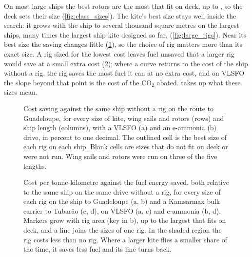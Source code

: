 On most large ships the best rotors are the most that fit on deck, up to \NumMostUnitsRotors{}, so the deck sets their size (\cref{fig:class_sizes}). The kite's best size stays well inside the search: it grows with the ship to several thousand square metres on the largest ships, many times the largest ship kite designed so far,  \citep{airseas_seawing_web} (\cref{fig:large_rigs}). Near its best size the saving changes little (\cref{fig:rig_comparison}), so the choice of rig matters more than its exact size. A rig sized for the lowest cost leaves fuel unsaved that a larger rig would save at a small extra cost (\cref{fig:abatement}); where a curve returns to the cost of the ship without a rig, the rig saves the most fuel it can at no extra cost, and on VLSFO the slope beyond that point is the cost of the CO$_2$ abated.  takes up what these sizes mean.

\begin{figure}[tbp]
\centering
{}
\caption{Cost saving against the same ship without a rig on the route to Guadeloupe, for every size of kite, wing sails and rotors (rows) and ship length (columns), with a VLSFO (a) and an e-ammonia (b) drive, in percent to one decimal. The outlined cell is the best size of each rig on each ship. Blank cells are sizes that do not fit on deck or were not run. Wing sails and rotors were run on three of the five lengths.}
\label{fig:rig_comparison}
\end{figure}

\begin{figure}[tbp]
\centering
{}
\caption{Cost per tonne-kilometre against the fuel energy saved, both relative to the same ship on the same drive without a rig, for every size of each rig on the  ship to Guadeloupe (a, b) and a Kamsarmax bulk carrier to Tubarão (c, d), on VLSFO (a, c) and e-ammonia (b, d). Markers grow with rig area (key in b), up to the largest that fits on deck, and a line joins the sizes of one rig. In the shaded region the rig costs less than no rig. Where a larger kite flies a smaller share of the time, it saves less fuel and its line turns back.}
\label{fig:abatement}
\end{figure}

